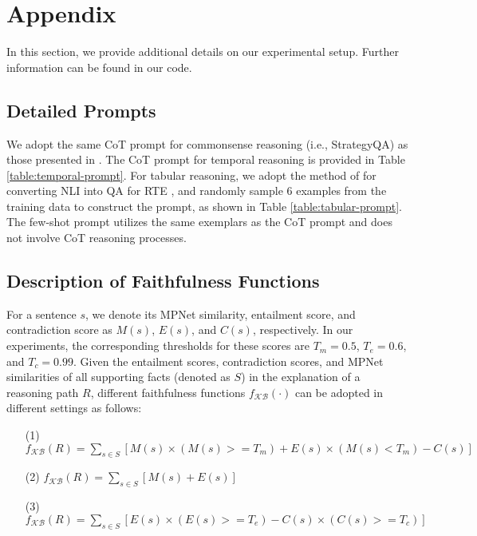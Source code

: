 \section{Appendix}
\label{sec:appendix}

In this section, we provide additional details on our experimental setup. Further information can be found in our code.

\subsection{Detailed Prompts}
\label{subsec:prompts}

We adopt the same CoT prompt for commonsense reasoning (i.e., StrategyQA) as those presented in \citet{wei2022chain}. The CoT prompt for temporal reasoning is provided in Table \ref{table:temporal-prompt}. For tabular reasoning, we adopt the method of \citet{brown2020language} for converting NLI into QA for RTE \cite{dagan2005pascal}, and randomly sample $6$ examples from the training data to construct the prompt, as shown in Table \ref{table:tabular-prompt}. The few-shot prompt utilizes the same exemplars as the CoT prompt and does not involve CoT reasoning processes.

\subsection{Description of Faithfulness Functions}
\label{subsec:faithfulness-functions}
For a sentence $s$, we denote its MPNet similarity, entailment score, and contradiction score as $M(s)$, $E(s)$, and $C(s)$, respectively. In our experiments, the corresponding thresholds for these scores are $T_m = 0.5$, $T_e = 0.6$, and $T_c = 0.99$. Given the entailment scores, contradiction scores, and MPNet similarities of all supporting facts (denoted as $S$) in the explanation of a reasoning path $R$, different faithfulness functions $f_{\mathcal{KB}}(\cdot)$ can be adopted in different settings as follows:
\begin{itemize}
    \item[(1)] $f_{\mathcal{KB}}(R) = \sum_{s \in S}
 [M(s) \times (M(s) >= T_m) + E(s) \times (M(s) < T_m)  - C(s)]$
    \item[(2)] $f_{\mathcal{KB}}(R) = \sum_{s \in S} [M(s) + E(s)]$
    \item[(3)] $f_{\mathcal{KB}}(R) = \sum_{s \in S} [E(s) \times (E(s) >= T_e) - C(s) \times (C(s) >= T_c)]$
\end{itemize}

